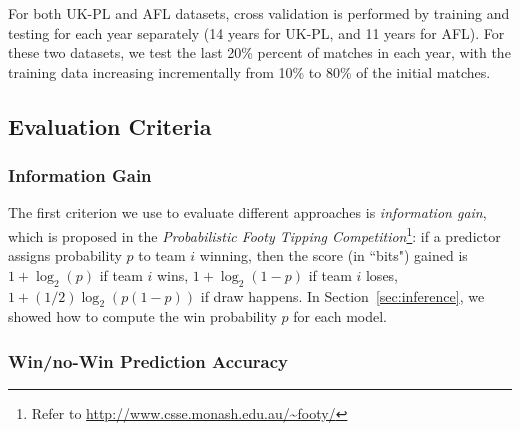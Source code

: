For both UK-PL and AFL datasets, cross validation is performed by
training and testing for each year separately (14 years for UK-PL, and
11 years for AFL).  For these two datasets, we test the last 20\%
percent of matches in each year, with the training data increasing
incrementally from 10\% to 80\% of the initial matches.

\subsection{Evaluation Criteria}


\subsubsection{Information Gain}
\label{sec:informationGain}

The first criterion we use to evaluate different approaches is
\emph{information gain}, which is proposed in the \emph{Probabilistic Footy
Tipping Competition}\footnote{Refer to
\url{http://www.csse.monash.edu.au/~footy/}}: if a predictor assigns
probability $p$ to team $i$ winning, then the score (in ``bits")
gained is $1+\log_2(p)$ if team $i$ wins, $1+\log_2(1-p)$ if team $i$ loses, $1+(1/2)\log_2(p(1-p))$ if draw happens.
In Section~\ref{sec:inference}, we showed how to compute the win
probability $p$ for each model.

\subsubsection{Win/no-Win Prediction Accuracy}
\label{sec:WLPredictionAccuracy}

